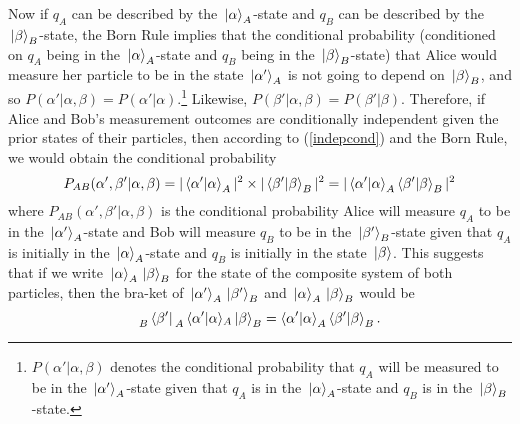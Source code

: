 Now if $q_A$ can be described by the $\ket*{\alpha}_A$-state and $q_B$ can be described by the $\ket*{\beta}_B$-state, the Born Rule implies that the conditional probability (conditioned on $q_A$ being in the $\ket*{\alpha}_A$-state and $q_B$ being in the $\ket*{\beta}_B$-state) that Alice would measure her particle to be in the state $\ket*{\alpha'}_A$ is not going to depend on $\ket*{\beta}_B$,  and so  $P(\alpha'|\alpha, \beta)=P(\alpha'|\alpha)$.\footnote{ $P(\alpha'|\alpha, \beta)$ denotes the conditional probability that $q_A$ will be measured to be in the $\ket*{\alpha'}_A$-state given that $q_A$ is in the $\ket*{\alpha}_A$-state and $q_B$ is in the $\ket*{\beta}_B$-state.} Likewise, $P(\beta'|\alpha, \beta)=P(\beta'|\beta)$. 
Therefore, if Alice and Bob's measurement outcomes are conditionally independent given the prior states of their particles, then according to (\ref{indepcond}) and the Born Rule, we would obtain the conditional probability
\begin{equation}\label{indepprob}
    P_{AB}(\alpha', \beta'|\alpha, \beta)=|\ip{\alpha'}{\alpha}_A|^2\times|\ip{\beta'}{\beta}_B|^2=|\ip{\alpha'}{\alpha}_A\ip{\beta'}{\beta}_B|^2
\end{equation}
where $P_{AB}(\alpha', \beta'|\alpha, \beta)$ is the conditional probability Alice will measure $q_A$ to be in the $\ket*{\alpha'}_A$-state and Bob will measure $q_B$ to be in the $\ket*{\beta'}_B$-state given that $q_A$ is initially in the $\ket*{\alpha}_A$-state and $q_B$ is initially in the state $\ket*{\beta}$. %
%
This suggests that if we write $\ket*{\alpha}_A\ket*{\beta}_B$ %
%
for the state of the composite system of both particles, then the bra-ket of $\ket*{\alpha'}_A\ket*{\beta'}_B$ and $\ket*{\alpha}_A\ket*{\beta}_B$ 
would be
\begin{equation}\label{innerprod}
    \prescript{}{B}{ \bra*{\beta'}}\prescript{}{A}{\ip*{\alpha'}{\alpha}}_A\ket*{\beta}_B=\ip{\alpha'}{\alpha}_A\ip{\beta'}{\beta}_B.
\end{equation} %
